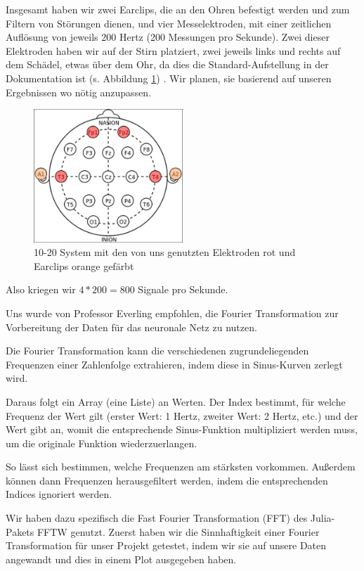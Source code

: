 \documentclass{scrartcl}
\begin{document}
	Insgesamt haben wir zwei Earclips, die an den Ohren befestigt werden und zum Filtern von Störungen dienen, und vier Messelektroden, mit einer zeitlichen Auflösung von jeweils 200 Hertz (200 Messungen pro Sekunde). Zwei dieser Elektroden haben wir auf der Stirn platziert, zwei jeweils links und rechts auf dem Schädel, etwas über dem Ohr, da dies die Standard-Aufstellung in der Dokumentation ist (s. Abbildung \ref{10-20-System}) \cite{OpenBCI}. Wir planen, sie basierend auf unseren Ergebnissen wo nötig anzupassen.

	\begin{figure}[h!]
		\centering
		\includegraphics[width=0.5\textwidth]{pictures/elektroden-platzierungen.png}
		\caption{10-20 System mit den von uns genutzten Elektroden rot und Earclips orange gefärbt}
		\label{10-20-System}
	\end{figure}

	\newpage

	Also kriegen wir $4 * 200 = 800$ Signale pro Sekunde.
	
	Uns wurde von Professor Everling empfohlen, die Fourier Transformation zur Vorbereitung der Daten für das neuronale Netz zu nutzen. 
	
	Die Fourier Transformation kann die verschiedenen zugrundeliegenden Frequenzen einer Zahlenfolge extrahieren, indem diese in Sinus-Kurven zerlegt wird.

	Daraus folgt ein Array (eine Liste) an Werten. Der Index bestimmt, für welche Frequenz der Wert gilt (erster Wert: 1 Hertz, zweiter Wert: 2 Hertz, etc.) und der Wert gibt an, womit die entsprechende Sinus-Funktion multipliziert werden muss, um die originale Funktion wiederzuerlangen. \cite{3b1b:fft}

	So lässt sich bestimmen, welche Frequenzen am stärksten vorkommen. Außerdem können dann Frequenzen herausgefiltert werden, indem die entsprechenden Indices ignoriert werden.

	Wir haben dazu spezifisch die Fast Fourier Transformation (FFT) des Julia-Pakets FFTW genutzt. Zuerst haben wir die Sinnhaftigkeit einer Fourier Transformation für unser Projekt getestet, indem wir sie auf unsere Daten angewandt und dies in einem Plot ausgegeben haben.
\end{document}
